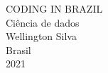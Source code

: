 \begin{center}
    {\large CODING IN BRAZIL}\\[10cm]
    {\huge Ciência de dados} \\[10cm]
    {\large Wellington Silva}\\[1cm]
    {\large Brasil}\\[0.2cm]
    {\large 2021}
\end{center}
